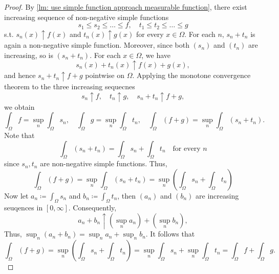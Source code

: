 \begin{proof}
    By \autoref{lm: use simple function approach measurable function}, there exist increasing sequence of non-negative simple functions 
    \[
        s_1 \le s_2 \le \dots \le f, \quad t_1 \le t_2 \le \dots \le g
    \] 
    s.t. \(s_n(x) \uparrow f(x)\) and \(t_n(x) \uparrow g(x)\) for every \(x \in \Omega\). For each \(n\), \(s_n + t_n\) is again a non-negative simple function. Moreover, since both \((s_n)\) and \((t_n)\) are increasing, so is \((s_n + t_n)\). For each \(x \in \Omega\), we have 
    \[
        s_n(x) + t_n(x) \uparrow f(x) + g(x),
    \]         
    and hence \(s_n + t_n \uparrow f + g\) pointwise on \(\Omega\). Applying the monotone convergence theorem to the three increasing sequecnes
    \[
        s_n \uparrow f, \quad t_n \uparrow g, \quad s_n + t_n \uparrow f + g,
    \]  
    we obtain 
    \[
        \int _\Omega f = \sup _n \int _\Omega s_n, \quad \int _\Omega g = \sup _n \int _\Omega t_n, \quad \int _\Omega (f + g) = \sup _n \int _\Omega (s_n + t_n).
    \]
    Note that 
    \[
        \int _\Omega (s_n + t_n) = \int _\Omega s_n + \int _\Omega t_n \quad \text{for every } n 
    \]
    since \(s_n, t_n\) are non-negative simple functions. Thus, 
    \[
        \int _\Omega (f + g) = \sup _n \int _\Omega (s_n + t_n) = \sup _n \left( \int _\Omega s_n + \int _\Omega t_n \right) 
    \] 
    Now let \(a_n \coloneqq \int _\Omega s_n\) and \(b_n \coloneqq \int _\Omega t_n\), then \((a_n)\) and \((b_n)\) are increasing seuqences in \([0, \infty]\). Consequently, 
    \[
        a_n + b_n \uparrow \left( \sup _n a_n \right) + \left( \sup _n b_n \right),  
    \]     
    Thus, \(\sup _n (a_n + b_n) = \sup _n a_n + \sup _n b_n\). It follows that 
    \[
        \int _\Omega (f + g) = \sup _n \left( \int _\Omega s_n + \int _\Omega t_n \right) = \sup _n \int _\Omega s_n + \sup _n \int_\Omega t_n = \int _\Omega f + \int _\Omega g.  
    \] 
\end{proof}
